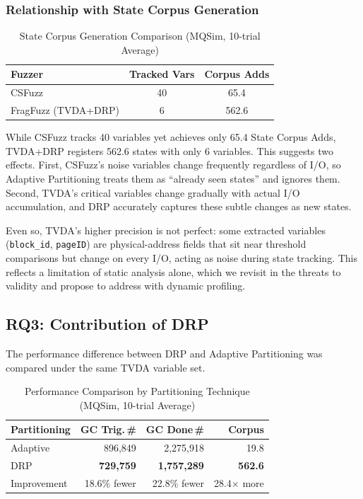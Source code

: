 \documentclass[conference]{IEEEtran}
\begin{document}
\subsubsection{Relationship with State Corpus Generation}

\begin{table}[t]
\centering
\caption{State Corpus Generation Comparison (MQSim, 10-trial Average)}
\label{tab:state_corpus}
\begin{tabularx}{\columnwidth}{@{}Xcc@{}}
\toprule
\textbf{Fuzzer} & \textbf{Tracked Vars} & \textbf{Corpus Adds} \\
\midrule
CSFuzz & 40 & 65.4 \\
FragFuzz (TVDA+DRP) & 6 & 562.6 \\
\bottomrule
\end{tabularx}
\end{table}

While CSFuzz tracks 40 variables yet achieves only 65.4 State Corpus Adds, TVDA+DRP registers 562.6 states with only 6 variables.
This suggests two effects.
First, CSFuzz's noise variables change frequently regardless of I/O, so Adaptive Partitioning treats them as ``already seen states'' and ignores them.
Second, TVDA's critical variables change gradually with actual I/O accumulation, and DRP accurately captures these subtle changes as new states.

Even so, TVDA's higher precision is not perfect: some extracted variables (\texttt{block\_id}, \texttt{pageID}) are physical-address fields that sit near threshold comparisons but change on every I/O, acting as noise during state tracking.
This reflects a limitation of static analysis alone, which we revisit in the threats to validity and propose to address with dynamic profiling.


\subsection{RQ3: Contribution of DRP}
The performance difference between DRP and Adaptive Partitioning was compared under the same TVDA variable set.

\begin{table}[h]
\centering
\caption{Performance Comparison by Partitioning Technique (MQSim, 10-trial Average)}
\label{tab:partitioning}
\begin{tabularx}{\columnwidth}{@{}Xrrr@{}}
\toprule
\textbf{Partitioning} & \textbf{GC Trig.\,\#} & \textbf{GC Done\,\#} & \textbf{Corpus} \\
\midrule
Adaptive & 896,849 & 2,275,918 & 19.8 \\
DRP & \textbf{729,759} & \textbf{1,757,289} & \textbf{562.6} \\
\midrule
Improvement & 18.6\% fewer & 22.8\% fewer & 28.4$\times$ more \\
\bottomrule
\end{tabularx}
\end{table}
\end{document}
